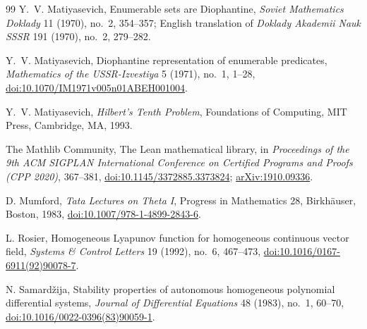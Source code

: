 \documentclass[11pt]{article}
\begin{document}
\begin{thebibliography}{99}
Y.~V. Matiyasevich,
\newblock Enumerable sets are Diophantine,
\newblock \emph{Soviet Mathematics Doklady} 11 (1970), no.~2, 354--357;
English translation of \emph{Doklady Akademii Nauk SSSR} 191 (1970),
no.~2, 279--282.

Y.~V. Matiyasevich,
\newblock Diophantine representation of enumerable predicates,
\newblock \emph{Mathematics of the USSR-Izvestiya} 5 (1971), no.~1,
1--28,
\newblock \href{https://doi.org/10.1070/IM1971v005n01ABEH001004}
{doi:10.1070/IM1971v005n01ABEH001004}.

Y.~V. Matiyasevich,
\newblock \emph{Hilbert's Tenth Problem},
\newblock Foundations of Computing, MIT Press, Cambridge, MA, 1993.

The Mathlib Community,
\newblock The Lean mathematical library,
\newblock in \emph{Proceedings of the 9th ACM SIGPLAN International
Conference on Certified Programs and Proofs (CPP 2020)}, 367--381,
\newblock \href{https://doi.org/10.1145/3372885.3373824}
{doi:10.1145/3372885.3373824};
\href{https://arxiv.org/abs/1910.09336}{arXiv:1910.09336}.

D. Mumford,
\newblock \emph{Tata Lectures on Theta I},
\newblock Progress in Mathematics 28, Birkh\"auser, Boston, 1983,
\newblock \href{https://doi.org/10.1007/978-1-4899-2843-6}
{doi:10.1007/978-1-4899-2843-6}.

L. Rosier,
\newblock Homogeneous Lyapunov function for homogeneous continuous vector
field,
\newblock \emph{Systems \& Control Letters} 19 (1992), no.~6, 467--473,
\newblock \href{https://doi.org/10.1016/0167-6911(92)90078-7}
{doi:10.1016/0167-6911(92)90078-7}.

N. Samard{\v z}ija,
\newblock Stability properties of autonomous homogeneous polynomial
differential systems,
\newblock \emph{Journal of Differential Equations} 48 (1983), no.~1,
60--70,
\newblock \href{https://doi.org/10.1016/0022-0396(83)90059-1}
{doi:10.1016/0022-0396(83)90059-1}.

\end{thebibliography}
\end{document}
